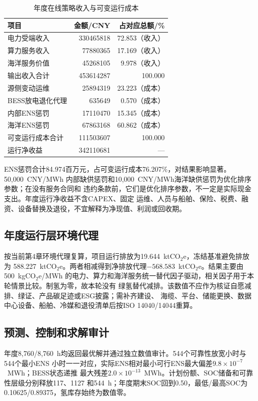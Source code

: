 \begin{table}[htbp]
\centering
\caption{年度在线策略收入与可变运行成本}
\label{tab:c5-annual-economics}
\begin{tabular}{lrr}
\toprule
项目 & 金额/CNY & 占对应总额/\%\\
\midrule
电力受端收入 & 330465818 & 72.853（收入）\\
算力服务收入 & 77880365 & 17.169（收入）\\
海洋服务价值 & 45268105 & 9.978（收入）\\
输出收入合计 & 453614287 & 100.000\\
\midrule
源侧变动运维 & 25894319 & 23.223（成本）\\
BESS放电退化代理 & 635649 & 0.570（成本）\\
内部ENS惩罚 & 17110470 & 15.345（成本）\\
海洋ENS惩罚 & 67863168 & 60.862（成本）\\
可变运行成本合计 & 111503607 & 100.000\\
\midrule
运行净收益 & 342110681 & ---\\
\bottomrule
\end{tabular}
\end{table}

ENS惩罚合计84.974百万元，占可变运行成本76.207\%，对结果影响显著。50,000~CNY/MWh
内部缺供惩罚和10,000~CNY/MWh海洋缺供惩罚为优化排序参数；在没有服务合同和
违约条款前，它们是优化排序参数，不一定是实际现金支出。年度运行净收益不含CAPEX、固定
运维、人员与船舶、保险、税费、融资、设备替换及退役，不宜解释为净现值、利润或回收期。

\subsection{年度运行层环境代理}

按当前第4章环境代理复算，项目运行排放为19.644~ktCO$_2$e，冻结基准避免排放为
588.227~ktCO$_2$e。两者相减得到净排放代理$-568.583$~ktCO$_2$e。结果主要由
500~kgCO$_2$e/MWh
的电力、算力和海洋服务统一替代因子驱动，相关因子用于本轮情景比较。制氢为零，故本轮没有
绿氢替代减排。该数值不应作为核证自愿减排、绿证、产品碳足迹或ESG披露；需补齐建设、
海缆、平台、储能更换、数据中心设备、船舶、冷媒和退役清单后按ISO 14040/14044重算。

\subsection{预测、控制和求解审计}

年度8,760/8,760~h均返回最优解并通过独立数值审计。544个可靠性放宽小时与544个最小ENS
小时一一对应，实际ENS相对最小可行ENS最大偏差$9.8\times10^{-7}$~MWh；BESS状态递推
最大残差$2.0\times10^{-13}$~MWh。计划份额、SOC储备和可靠性层级分别释放117、1127
和544~h；年度期末SOC回到0.50，最低/最高SOC为0.10625/0.89375，氢库存始终为数值零。

